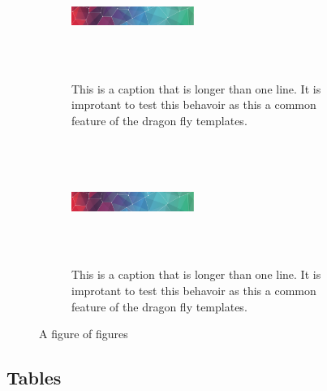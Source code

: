 \documentclass[draft]{dragonfly-report}
\begin{document}
\begin{figure}[h]

 \begin{subfigure}{0.45\textwidth}
  \includegraphics[width=40mm,height=40mm]{pattern}
  \caption{This is a caption that is longer than one line. It is improtant to test this behavoir as this a common feature of the dragon fly templates.}
\end{subfigure}\qquad %
  \begin{subfigure}{0.45\textwidth}
  \includegraphics[width=40mm,height=40mm]{pattern}
  \caption{This is a caption that is longer than one line. It is improtant to test this behavoir as this a common feature of the dragon fly templates.}
\end{subfigure}
\caption{A figure of figures}
\end{figure}

\clearpage
\subsection{Tables}
\end{document}
